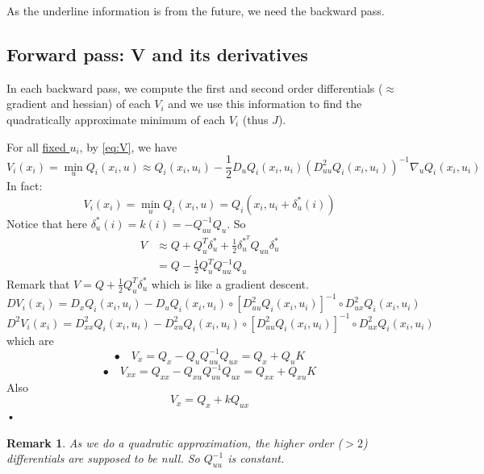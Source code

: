 \documentclass{report}
\newtheorem*{remark}{Remark}
\begin{document}
As the underline information is from the future, we need the backward pass.

\subsection{Forward pass: V and its derivatives}
In each backward pass, we compute the first and second order differentials ($\approx$gradient and hessian) of each $V_i$ and we use this information to find the quadratically approximate minimum of each $V_i$ (thus $J$).%

For all \underline{fixed $u_i$}, by \ref{eq:V}, we have
\begin{equation}
\label{V approx}
V_i(x_i) =\min_u Q_i(x_i,u) \approx Q_i(x_i, u_i) - \frac{1}{2} D_u Q_i (x_i, u_i) (D_{uu}^2 Q_i (x_i, u_i))^{-1} \nabla_u Q_i (x_i, u_i)
\end{equation}
In fact:
\begin{equation}
V_i(x_i) = \min_u Q_i(x_i,u) = Q_i(x_i,u_i + \delta_u^*(i)) 
\end{equation}
Notice that here $\delta_u^*(i) = k(i) = - Q_{uu}^{-1} Q_u$. So
\begin{equation}
\begin{split}
V &\approx Q + Q_u^T \delta_u^* + \frac{1}{2} \delta_u^{*^T} Q_{uu} \delta_u^* \\
& = Q - \frac{1}{2} Q_u^T Q_{uu}^{-1} Q_u 
\end{split}
\end{equation}
Remark that $V = Q + \frac{1}{2} Q_u^T \delta_u^*$ which is like a gradient descent.
\begin{equation}
    DV_i(x_i)  = D_x Q_i(x_i,u_i) - D_u Q_i (x_i, u_i) \circ [D_{uu}^2 Q_i (x_i, u_i)]^{-1} \circ D_{ux}^2 Q_i (x_i,u_i)
\end{equation}
\begin{equation}
    D^2 V_i(x_i) = D_{xx}^2 Q_i(x_i, u_i) - D_{xu}^2 Q_i (x_i,u_i) \circ [D_{uu}^2 Q_i (x_i, u_i)]^{-1} \circ D_{ux}^2 Q_i (x_i,u_i)
\end{equation}
which are
\begin{equation}
\bullet \quad V_x = Q_x - Q_u Q_{uu}^{-1} Q_{ux} = Q_x + Q_u K 
\end{equation}
\begin{equation}
\bullet \quad V_{xx} = Q_{xx} - Q_{xu} Q_{uu}^{-1} Q_{ux} = Q_{xx} + Q_{xu} K
\end{equation}
Also
\begin{equation}
 V_x = Q_x + k Q_{ux}
\end{equation}•
\begin{remark}
As we do a quadratic approximation, the higher order ($>2$) differentials are supposed to be null. So $Q_{uu}^{-1}$ is constant.
\end{remark}
\end{document}
